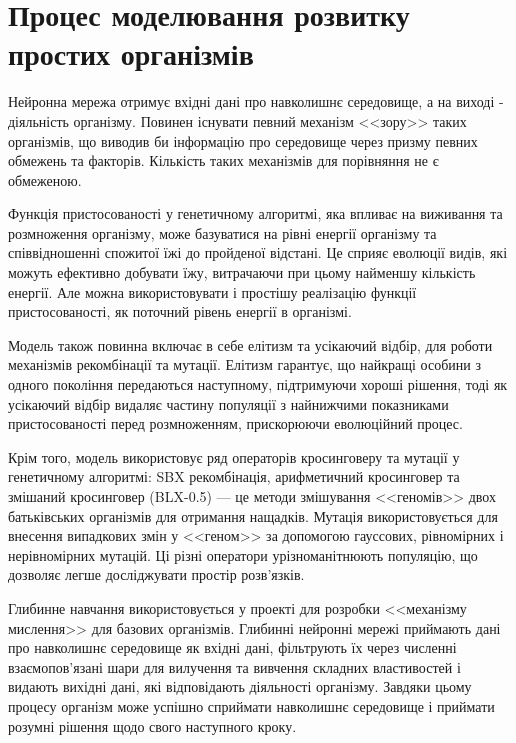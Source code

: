 \section{Процес моделювання розвитку простих організмів}

Нейронна мережа отримує вхідні дані про навколишнє середовище, 
а на виході - діяльність організму. 
Повинен існувати певний механізм <<зору>> таких організмів,
що виводив би інформацію про середовище через призму певних
обмежень та факторів.
Кількість таких механізмів для порівняння не є обмеженою.

Функція пристосованості у генетичному алгоритмі, 
яка впливає на виживання та розмноження організму, 
може базуватися на рівні енергії організму та 
співвідношенні спожитої їжі до пройденої відстані. 
Це сприяє еволюції видів, які можуть ефективно добувати їжу, 
витрачаючи при цьому найменшу кількість енергії.
Але можна використовувати і простішу реалізацію функції пристосованості,
як поточний рівень енергії в організмі.

Модель також повинна включає в себе елітизм та усікаючий відбір,
для роботи механізмів рекомбінації та мутації.
Елітизм гарантує, що найкращі особини з одного покоління 
передаються наступному, підтримуючи хороші рішення, 
тоді як усікаючий відбір видаляє частину популяції з найнижчими 
показниками пристосованості перед розмноженням, 
прискорюючи еволюційний процес.

Крім того, модель використовує ряд операторів 
кросинговеру та мутації у генетичному алгоритмі:
SBX рекомбінація, 
арифметичний кросинговер 
та змішаний кросинговер (BLX-0.5) --- 
це методи змішування <<геномів>> двох батьківських 
організмів для отримання нащадків. 
Мутація використовується для внесення випадкових 
змін у <<геном>> за допомогою гауссових, 
рівномірних і нерівномірних мутацій. 
Ці різні оператори урізноманітнюють популяцію, 
що дозволяє легше досліджувати простір розв'язків.

Глибинне навчання використовується у проекті для розробки 
<<механізму мислення>> для базових організмів. 
Глибинні нейронні мережі приймають дані про навколишнє середовище 
як вхідні дані, фільтрують їх через численні взаємопов'язані 
шари для вилучення та вивчення складних властивостей 
і видають вихідні дані, які відповідають діяльності організму. 
Завдяки цьому процесу організм може успішно сприймати навколишнє 
середовище і приймати розумні рішення щодо свого наступного кроку.

